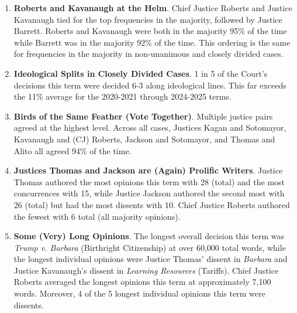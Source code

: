 \documentclass[
  12pt,
]{article}
\begin{document}
\begin{enumerate}

\item \Large \textbf{Roberts and Kavanaugh at the Helm}. \normalsize Chief Justice Roberts and Justice Kavanaugh tied for the top frequencies in the majority, followed by Justice Barrett. Roberts and Kavanaugh were both in the majority 95\% of the time while Barrett was in the majority 92\% of the time. This ordering is the same for frequencies in the majority in non-unanimous and closely divided cases. \par \vspace{2.5mm}

\item \Large \textbf{Ideological Splits in Closely Divided Cases}. \normalsize 1 in 5 of the Court’s decisions this term were decided 6-3 along ideological lines. This far exceeds the 11\% average for the 2020-2021 through 2024-2025 terms. \par \vspace{2.5mm}

\item \Large \textbf{Birds of the Same Feather (Vote Together)}. \normalsize Multiple justice pairs agreed at the highest level. Across all cases, Justices Kagan and Sotomayor, Kavanaugh and (CJ) Roberts, Jackson and Sotomayor, and Thomas and Alito all agreed 94\% of the time. \par \vspace{2.5mm}

\item \Large \textbf{Justices Thomas and Jackson are (Again) Prolific Writers}. \normalsize  Justice Thomas authored the most opinions this term with 28 (total) and the most concurrences with 15, while Justice Jackson authored the second most with 26 (total) but had the most dissents with 10. Chief Justice Roberts authored the fewest with 6 total (all majority opinions). \par \vspace{2.5mm}

\item \Large \textbf{Some (Very) Long Opinions}. \normalsize The longest overall decision this term was \emph{Trump v. Barbara} (Birthright Citizenship) at over 60,000 total words, while the longest individual opinions were Justice Thomas’ dissent in \emph{Barbara} and Justice Kavanaugh’s dissent in \emph{Learning Resources} (Tariffs). Chief Justice Roberts averaged the longest opinions this term at approximately 7,100 words. Moreover, 4 of the 5 longest individual opinions this term were dissents.

\end{enumerate}
\end{document}
